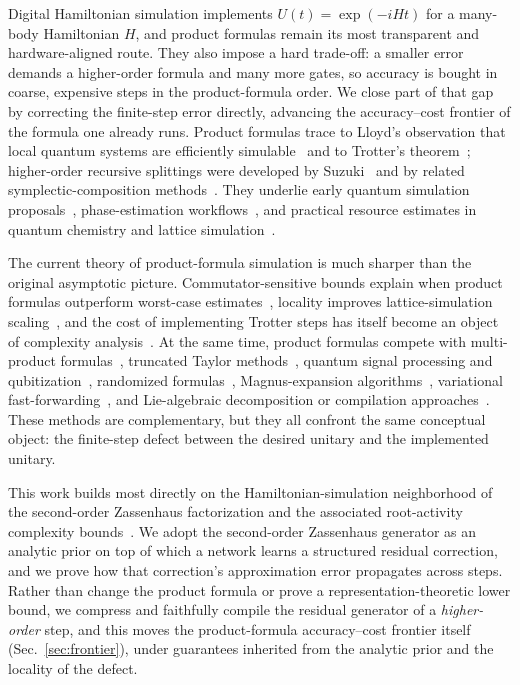 \documentclass[aps,prresearch,reprint,superscriptaddress,nofootinbib,amsmath,amssymb]{revtex4-2}
\begin{document}
Digital Hamiltonian simulation implements $U(t)=\exp(-iHt)$ for a many-body Hamiltonian $H$, and product formulas remain its most transparent and hardware-aligned route. They also impose a hard trade-off: a smaller error demands a higher-order formula and many more gates, so accuracy is bought in coarse, expensive steps in the product-formula order. We close part of that gap by correcting the finite-step error directly, advancing the accuracy--cost frontier of the formula one already runs. Product formulas trace to Lloyd's observation that local quantum systems are efficiently simulable~\cite{lloyd1996} and to Trotter's theorem~\cite{trotter1959}; higher-order recursive splittings were developed by Suzuki~\cite{suzuki1990,suzuki1991,suzuki1993} and by related symplectic-composition methods~\cite{yoshida1990,forest1990,chin1997,hatano2005,wiebe2010}. They underlie early quantum simulation proposals~\cite{abrams1997,sornborger1999,ortiz2001}, phase-estimation workflows~\cite{kitaev1997,kitaev2002,abrams1999,cleve1998}, and practical resource estimates in quantum chemistry and lattice simulation~\cite{aspuruguzik2005,wecker2014,wecker2015,babbush2015,reiher2017,kivlichan2018,haah2021}.

The current theory of product-formula simulation is much sharper than the original asymptotic picture. Commutator-sensitive bounds explain when product formulas outperform worst-case estimates~\cite{childs2021,layden2022,zhuk2023}, locality improves lattice-simulation scaling~\cite{childs2019lattice,lieb1972,tran2020}, and the cost of implementing Trotter steps has itself become an object of complexity analysis~\cite{low2023pra}. At the same time, product formulas compete with multi-product formulas~\cite{childs2012mpf}, truncated Taylor methods~\cite{berry2015prl}, quantum signal processing and qubitization~\cite{berry2007,berry2014,low2017qsp,low2019qubitization}, randomized formulas~\cite{campbell2019,ouyang2020,childs2022,chen2022a}, Magnus-expansion algorithms~\cite{magnus1954,blanes2009,sharma2024,fang2025}, variational fast-forwarding~\cite{cirstoiu2020}, and Lie-algebraic decomposition or compilation approaches~\cite{kokcu2022,steckmann2023,wu2023,zeier2011}. These methods are complementary, but they all confront the same conceptual object: the finite-step defect between the desired unitary and the implemented unitary.

This work builds most directly on the Hamiltonian-simulation neighborhood of the
second-order Zassenhaus factorization and the associated root-activity
complexity bounds~\cite{nguyen2025zassenhaus,jing2026complexity}. We adopt the
second-order Zassenhaus generator as an analytic prior on top of which a network
learns a structured residual correction, and we prove how that correction's
approximation error propagates across steps. Rather than change the product
formula or prove a representation-theoretic lower bound, we compress and
faithfully compile the residual generator of a \emph{higher-order} step, and this
moves the product-formula accuracy--cost frontier itself
(Sec.~\ref{sec:frontier}), under guarantees inherited from the analytic prior and
the locality of the defect.
\end{document}
